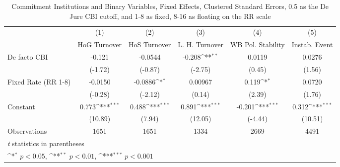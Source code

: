 \begin{table}[htbp]\centering
\def\sym#1{\ifmmode^{#1}\else\(^{#1}\)\fi}
\caption{Commitment Institutions and Binary Variables, Fixed Effects, Clustered Standard Errors, 0.5 as the De Jure CBI cutoff, and 1-8 as fixed, 8-16 as floating on the RR scale \label{binaryIndFEDF}}
\begin{tabular}{l*{5}{c}}
\toprule
                                        &\multicolumn{1}{c}{(1)}&\multicolumn{1}{c}{(2)}&\multicolumn{1}{c}{(3)}&\multicolumn{1}{c}{(4)}&\multicolumn{1}{c}{(5)}\\
                                        &\multicolumn{1}{c}{HoG Turnover}&\multicolumn{1}{c}{HoS Turnover}&\multicolumn{1}{c}{L. H. Turnover}&\multicolumn{1}{c}{WB Pol. Stability}&\multicolumn{1}{c}{Instab. Event}\\
\midrule
De facto CBI                            &   -0.121         &  -0.0544         &   -0.208\sym{**} &   0.0119         &   0.0276         \\
                                        &  (-1.72)         &  (-0.87)         &  (-2.75)         &   (0.45)         &   (1.56)         \\
\addlinespace
Fixed Rate (RR 1-8)                     &  -0.0150         &  -0.0886\sym{*}  &  0.00967         &    0.119\sym{*}  &   0.0720         \\
                                        &  (-0.28)         &  (-2.12)         &   (0.14)         &   (2.39)         &   (1.76)         \\
\addlinespace
Constant                                &    0.773\sym{***}&    0.488\sym{***}&    0.891\sym{***}&   -0.201\sym{***}&    0.312\sym{***}\\
                                        &  (10.89)         &   (7.94)         &  (12.05)         &  (-4.44)         &  (10.51)         \\
\midrule
Observations                            &     1651         &     1651         &     1334         &     2669         &     4491         \\
\bottomrule
\multicolumn{6}{l}{\footnotesize \textit{t} statistics in parentheses}\\
\multicolumn{6}{l}{\footnotesize \sym{*} \(p<0.05\), \sym{**} \(p<0.01\), \sym{***} \(p<0.001\)}\\
\end{tabular}
\end{table}
